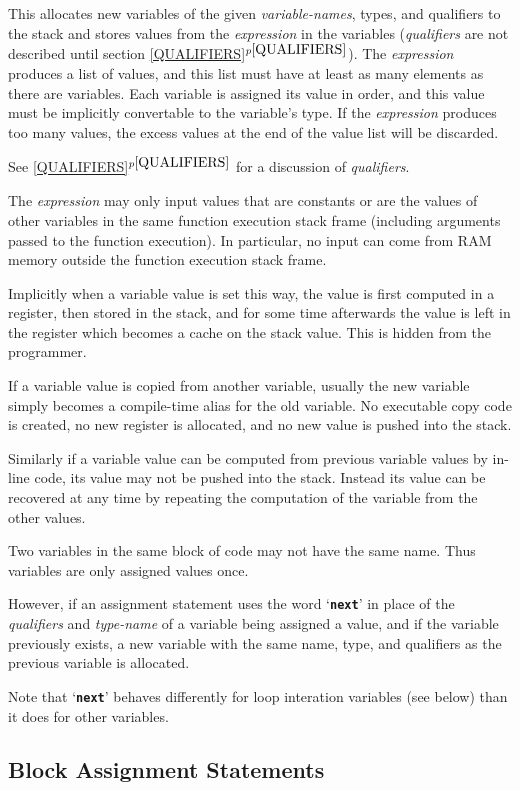 \documentclass[12pt]{article}
\newcommand{\TT}[1]{{\tt \bfseries #1}}
\newcommand{\itemref}[1]{\ref{#1}$^{p\pageref{#1}}$}
\begin{document}
This allocates new variables of the given {\em variable-names}, types,
and qualifiers
to the stack and stores values from the {\em expression} in the variables
({\em qualifiers} are not described until section \itemref{QUALIFIERS}).
The {\em expression} produces a list of values, and this list must have
at least as many elements as there are variables.  Each variable is
assigned its value in order, and this value must be implicitly
convertable to the variable's type.  If the {\em expression} produces
too many values, the excess values at the end of the value list will be
discarded.

See \itemref{QUALIFIERS} for a discussion of {\em qualifiers}.

The {\em expression} may only input values that are constants or are
the values of other variables in the same function execution
stack frame (including
arguments passed to the function execution).  In particular,
no input can come from RAM memory outside the function execution stack frame.

Implicitly when a variable value is set this way, the value is first
computed in a register, then stored in the stack, and for some time
afterwards the value is left in the register which becomes a cache
on the stack value.  This is hidden from the programmer.

If a variable value is copied from another variable, usually the
new variable simply becomes a compile-time alias for the old variable.
No executable copy code is created, no new register is allocated, and no new
value is pushed into the stack.

Similarly if a variable value can be computed from previous variable
values by in-line code, 
its value may not be pushed into the stack.  Instead its
value can be recovered at any time by repeating the computation
of the variable from the other values.

Two variables in the same block of code may not have the same
name.  Thus variables are only assigned values once.

However, if an assignment statement uses the word `\TT{next}' in
place of the {\em qualifiers} and {\em type-name}
of a variable being assigned a value, and
if the variable previously exists, a new variable with the same
name, type, and qualifiers as the previous variable is allocated.

Note that `\TT{next}' behaves differently for loop interation
variables (see below) than it does for other variables.

\subsection{Block Assignment Statements}
\label{BlOCK-ASSIGNMENT-STATEMENTS}
\end{document}
